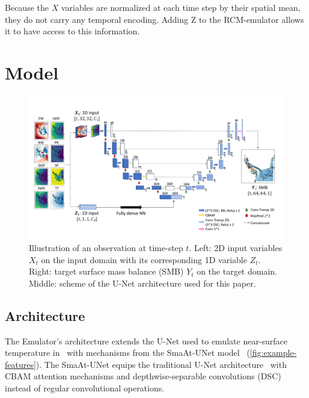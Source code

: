 \documentclass[a4paper,11pt,oneside]{report}
\begin{document}
Because the $X$ variables are normalized at each time step by their spatial mean, they do not carry any temporal encoding. Adding Z to the RCM-emulator allows it to have access to this information. 



\section{Model}\label{sec:model}

\begin{figure}[!t]
  \centering
  \includegraphics[width=\columnwidth]{doc/Thesis-latex/images/unet-with-data.pdf}
  \caption []{\small Illustration of an observation at time-step $t$. Left: 2D input variables $X_t$ on the input domain with its corresponding 1D variable $Z_t$. Right: target surface mass balance (SMB) $Y_t$ on the target domain. Middle: scheme of the U-Net architecture used for this paper.}
  \vspace{-3mm}
  \label{fig:example-features}
\end{figure}

\subsection{Architecture}\label{subsec:architecture}
The Emulator's architecture extends the U-Net used to emulate near-surface temperature in~\cite{Doury} with mechanisms from the SmaAt-UNet model~\cite{smatunet} (\autoref{fig:example-features}). The SmaAt-UNet equips the traditional U-Net architecture~\cite{unet} with CBAM attention mechanisms and depthwise-separable convolutions (DSC) instead of regular convolutional operations.
\end{document}
